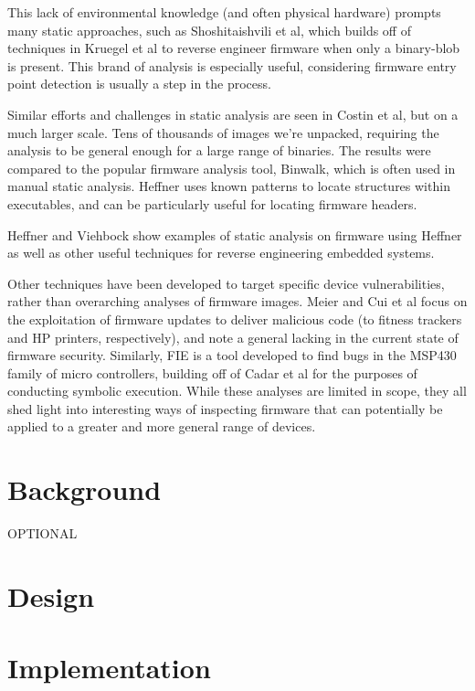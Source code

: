 \documentclass[letterpaper,twocolumn,10pt]{article}
\begin{document}
This lack of environmental knowledge (and often physical hardware) prompts many static approaches, such as Shoshitaishvili et al\cite{firmalice2015}, which builds off of techniques in Kruegel et al\cite{staticdisassembly2002} to reverse engineer firmware when only a binary-blob is present. This brand of analysis is especially useful, considering firmware entry point detection is usually a step in the process. 

Similar efforts and challenges in static analysis are seen in Costin et al\cite{analysisofembeddedfirmware2014}, but on a much larger scale. Tens of thousands of images we’re unpacked, requiring the analysis to be general enough for a large range of binaries. The results were compared to the popular firmware analysis tool, Binwalk\cite{binwalk}, which is often used in manual static analysis. Heffner\cite{binwalk} uses known patterns to locate structures within executables, and can be particularly useful for locating firmware headers.

Heffner\cite{wrt120N2014} and Viehbock\cite{braindump2011} show examples of static analysis on firmware using Heffner\cite{binwalk} as well as other useful techniques for reverse engineering embedded systems.

Other techniques have been developed to target specific device vulnerabilities, rather than overarching analyses of firmware images. Meier\cite{fitnesstrackers2016} and Cui et al\cite{firmwaremodsattack} focus on the exploitation of firmware updates to deliver malicious code (to fitness trackers and HP printers, respectively), and note a general lacking in the current state of firmware security. Similarly, FIE\cite{fie2013} is a tool developed to find bugs in the MSP430 family of micro controllers, building off of Cadar et al\cite{klee2008} for the purposes of conducting symbolic execution. While these analyses are limited in scope, they all shed light into interesting ways of inspecting firmware that can potentially be applied to a greater and more general range of devices. 

\section{Background}
OPTIONAL

\section{Design}

\section{Implementation}
\end{document}
